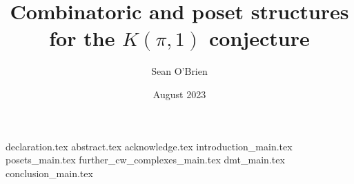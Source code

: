 \documentclass[msc]{guthesis}
\title{Combinatoric and poset structures for the $K(\pi,1)$ conjecture}
\author{Sean O'Brien}
\date{August 2023}
\begin{document}
\maketitle
{declaration.tex}
\newpage
{abstract.tex}
{acknowledge.tex}
\newpage
\tableofcontents
{introduction_main.tex}
{posets_main.tex}
{further_cw_complexes_main.tex}
{dmt_main.tex}
{conclusion_main.tex}




\end{document}
